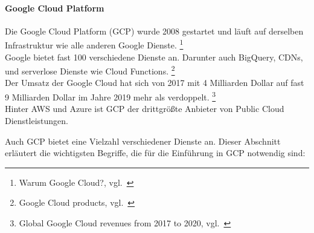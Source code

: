 \paragraph{Google Cloud Platform}\label{caas_tools_gcp}

Die Google Cloud Platform (GCP) wurde 2008 gestartet und läuft auf derselben Infrastruktur wie alle anderen Google Dienste.
\footnote{{Warum Google Cloud?, vgl.~\cite{GCP_WHY}}} \\

Google bietet fast 100 verschiedene Dienste an.
Darunter auch BigQuery, CDNs, und serverlose Dienste wie Cloud Functions.
\footnote{{Google Cloud products, vgl.~\cite{GCP_PRODUCTS}}} \\

Der Umsatz der Google Cloud hat sich von 2017 mit 4 Milliarden Dollar auf fast 9 Milliarden Dollar im Jahre 2019 mehr als verdoppelt.
\footnote{{Global Google Cloud revenues from 2017 to 2020, vgl.~\cite{GCP_REVENUE}}} \\

Hinter AWS und Azure ist GCP der drittgrößte Anbieter von Public Cloud Dienstleistungen.


Auch GCP bietet eine Vielzahl verschiedener Dienste an.
Dieser Abschnitt erläutert die wichtigsten Begriffe, die für die Einführung in GCP notwendig sind:

